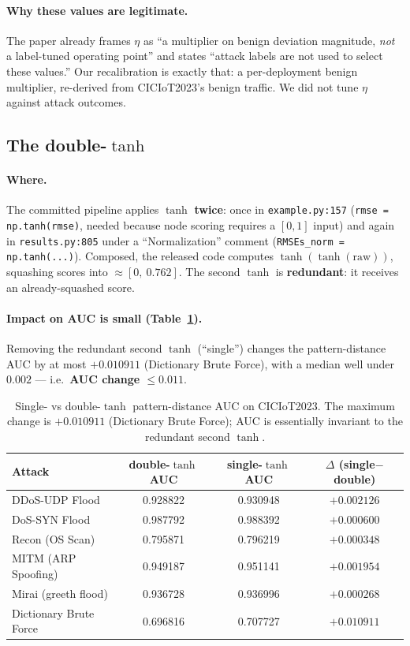 \documentclass[11pt]{article}
\begin{document}
\paragraph{Why these values are legitimate.} The paper already frames $\eta$ as ``a multiplier on
benign deviation magnitude, \emph{not} a label-tuned operating point'' and states ``attack labels are
not used to select these values.'' Our recalibration is exactly that: a per-deployment benign
multiplier, re-derived from CICIoT2023's benign traffic. We did not tune $\eta$ against attack
outcomes.

\subsection{The double-$\tanh$}
\label{sec:tanh}

\paragraph{Where.} The committed pipeline applies $\tanh$ \textbf{twice}: once in
\texttt{example.py:157} (\texttt{rmse\,=\,np.tanh(rmse)}, needed because node scoring requires a
$[0,1]$ input) and again in \texttt{results.py:805} under a ``Normalization'' comment
(\texttt{RMSEs\_norm\,=\,np.tanh(...)}). Composed, the released code computes
$\tanh(\tanh(\text{raw}))$, squashing scores into $\approx[0,\ 0.762]$. The second $\tanh$ is
\textbf{redundant}: it receives an already-squashed score.

\paragraph{Impact on AUC is small (Table~\ref{tab:tanh}).} Removing the redundant second $\tanh$
(``single'') changes the pattern-distance AUC by at most $+0.010911$ (Dictionary Brute Force), with
a median well under $0.002$ --- i.e.\ \textbf{AUC change $\le 0.011$}.

\begin{table}[t]
\centering
\caption{Single- vs double-$\tanh$ pattern-distance AUC on CICIoT2023. The maximum change is
$+0.010911$ (Dictionary Brute Force); AUC is essentially invariant to the redundant second $\tanh$.}
\label{tab:tanh}
\begin{tabular}{lccc}
\toprule
\textbf{Attack} & \textbf{double-$\tanh$ AUC} & \textbf{single-$\tanh$ AUC} & \textbf{$\Delta$ (single$-$double)} \\
\midrule
DDoS-UDP Flood         & 0.928822 & 0.930948 & $+0.002126$ \\
DoS-SYN Flood          & 0.987792 & 0.988392 & $+0.000600$ \\
Recon (OS Scan)        & 0.795871 & 0.796219 & $+0.000348$ \\
MITM (ARP Spoofing)    & 0.949187 & 0.951141 & $+0.001954$ \\
Mirai (greeth flood)   & 0.936728 & 0.936996 & $+0.000268$ \\
Dictionary Brute Force & 0.696816 & 0.707727 & $+0.010911$ \\
\bottomrule
\end{tabular}
\end{table}
\end{document}
